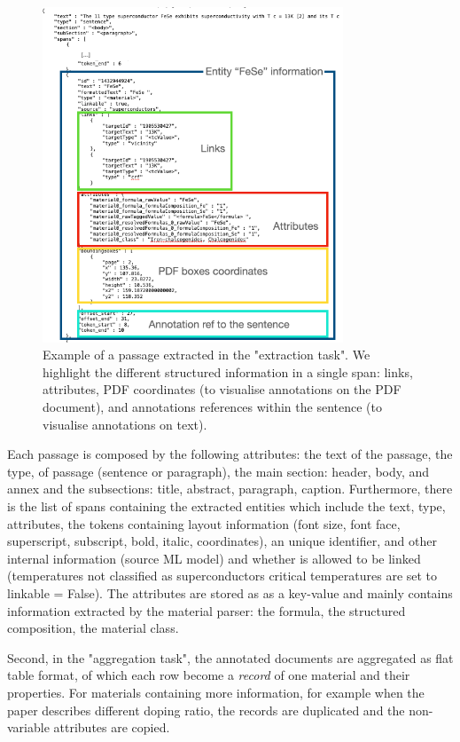 \documentclass[a4paper]{article}
\begin{document}
\begin{figure}[ht]
  \centering
  \includegraphics[width=0.8\textwidth]{images/data-flow-2} 
  \caption{Example of a passage extracted in the "extraction task". We highlight the different structured information in a single span: links, attributes, PDF coordinates (to visualise annotations on the PDF document), and annotations references within the sentence (to visualise annotations on text).}
  \label{fig:data-flow-2}
\end{figure}

Each passage is composed by the following attributes: the text of the passage, the type, of passage (sentence or paragraph), the main section: header, body, and annex and the subsections: title, abstract, paragraph, caption. 
Furthermore, there is the list of spans containing the extracted entities which include the text, type, attributes, the tokens containing layout information (font size, font face, superscript, subscript, bold, italic, coordinates), an unique identifier, and other internal information (source ML model) and whether is allowed to be linked (temperatures not classified as superconductors critical temperatures are set to linkable = False).
The attributes are stored as as a key-value and mainly contains information extracted by the material parser: the formula, the structured composition, the material class.  

Second, in the "aggregation task", the annotated documents are aggregated as flat table format, of which each row become a \textit{record} of one material and their properties. For materials containing more information, for example when the paper describes different doping ratio, the records are duplicated and the non-variable attributes are copied. 
\end{document}
